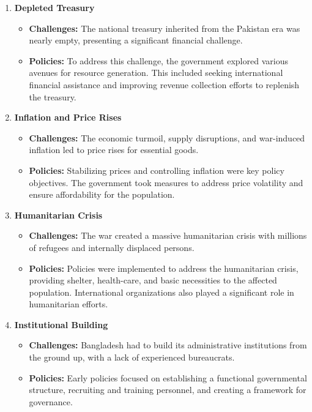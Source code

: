 \begin{enumerate}
	\item\textbf{Depleted Treasury}
	\begin{itemize}
		\item\textbf{Challenges:} The national treasury inherited from the Pakistan era was nearly empty, 
		presenting a significant financial challenge.
		\item\textbf{Policies:} To address this challenge, the government explored various avenues for 
		resource generation. This included seeking international financial assistance and improving revenue 
		collection efforts to replenish the treasury.
	\end{itemize}
	
	\item\textbf{Inflation and Price Rises}
	\begin{itemize}
		\item\textbf{Challenges:} The economic turmoil, supply disruptions, and war-induced inflation led 
		to price rises for essential goods.
		\item\textbf{Policies:} Stabilizing prices and controlling inflation were key policy objectives. 
		The government took measures to address price volatility and ensure affordability for the population.
	\end{itemize}
	
	\item\textbf{Humanitarian Crisis}
	\begin{itemize}
		\item\textbf{Challenges:} The war created a massive humanitarian crisis with millions of refugees 
		and internally displaced persons.
		\item\textbf{Policies:} Policies were implemented to address the humanitarian crisis, 
		providing shelter, health-care, and basic necessities to the affected population. 
		International organizations also played a significant role in humanitarian efforts.
	\end{itemize}
	
	\item\textbf{Institutional Building}
	\begin{itemize}
		\item\textbf{Challenges:} Bangladesh had to build its administrative institutions from the ground up, 
		with a lack of experienced bureaucrats.
		\item\textbf{Policies:} Early policies focused on establishing a functional governmental structure, 
		recruiting and training personnel, and creating a framework for governance.
	\end{itemize}
	

\end{enumerate}
